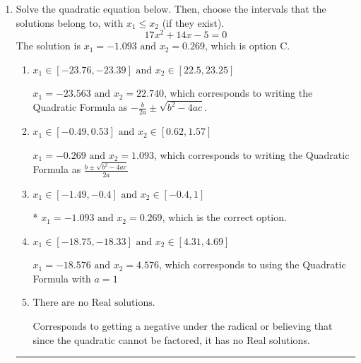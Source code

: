 \documentclass{extbook}[14pt]
\newcommand{\litem}[1]{\item #1

\rule{\textwidth}{0.4pt}}
\begin{document}
\begin{enumerate}\litem{
Solve the quadratic equation below. Then, choose the intervals that the solutions belong to, with $x_1 \leq x_2$ (if they exist).
\[ 17x^{2} +14 x -5 = 0 \]
The solution is \( x_1 = -1.093 \text{ and } x_2 = 0.269 \), which is option C.\begin{enumerate}[label=\Alph*.]
\item \( x_1 \in [-23.76, -23.39] \text{ and } x_2 \in [22.5, 23.25] \)

 $x_1 = -23.563 \text{ and } x_2 = 22.740$, which corresponds to writing the Quadratic Formula as $-\frac{b}{2a} \pm \sqrt{b^2 - 4ac}$.
\item \( x_1 \in [-0.49, 0.53] \text{ and } x_2 \in [0.62, 1.57] \)

 $x_1 = -0.269 \text{ and } x_2 = 1.093$, which corresponds to writing the Quadratic Formula as $\frac{b \pm \sqrt{b^2 - 4ac}}{2a}$
\item \( x_1 \in [-1.49, -0.4] \text{ and } x_2 \in [-0.4, 1] \)

* $x_1 = -1.093 \text{ and } x_2 = 0.269$, which is the correct option.
\item \( x_1 \in [-18.75, -18.33] \text{ and } x_2 \in [4.31, 4.69] \)

 $x_1 = -18.576 \text{ and } x_2 = 4.576$, which corresponds to using the Quadratic Formula with $a=1$
\item \( \text{There are no Real solutions.} \)

Corresponds to getting a negative under the radical or believing that since the quadratic cannot be factored, it has no Real solutions.
\end{enumerate}

}
\end{enumerate}
\end{document}
